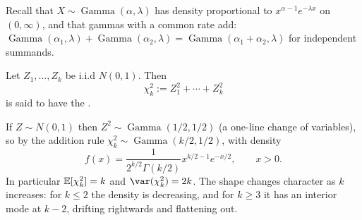 \documentclass[a4paper]{scrartcl}
\newcommand{\Gam}{\operatorname{Gamma}}
\begin{document}
Recall that $X \sim \Gam(\alpha, \lambda)$ has density proportional to $x^{\alpha - 1}e^{-\lambda x}$ on $(0, \infty)$, and that gammas with a common rate add: $\Gam(\alpha_1, \lambda) + \Gam(\alpha_2, \lambda) = \Gam(\alpha_1 + \alpha_2, \lambda)$ for independent summands.

\begin{definition}
  Let $Z_1, \dots, Z_k$ be i.i.d $N(0,1)$. Then
  $$
  \chi^2_k := Z_1^2 + \cdots + Z_k^2
  $$
  is said to have the .
\end{definition}

If $Z \sim N(0,1)$ then $Z^2 \sim \Gam(1/2, 1/2)$ (a one-line change of variables), so by the addition rule $\chi^2_k \sim \Gam(k/2, 1/2)$, with density
$$
f(x) = \frac{1}{2^{k/2}\Gamma(k/2)} x^{k/2 - 1}e^{-x/2}, \qquad x > 0.
$$
In particular $\mathbb{E}[\chi^2_k] = k$ and $\var(\chi^2_k) = 2k$. The shape changes character as $k$ increases: for $k \leq 2$ the density is decreasing, and for $k \geq 3$ it has an interior mode at $k - 2$, drifting rightwards and flattening out.
\end{document}

